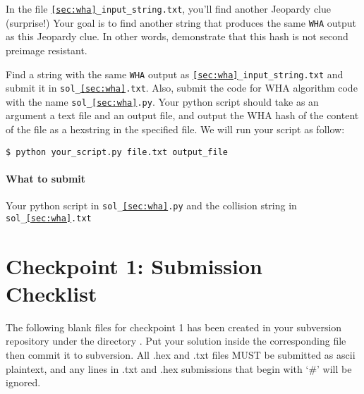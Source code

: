 \documentclass[letterpaper,12pt]{report}
\begin{document}
\smallskip
\noindent
In the file {\tt \ref{sec:wha}\_input\_string.txt}, you'll find another Jeopardy clue (surprise!) Your goal is to find another string that produces the same {\tt WHA} output as this Jeopardy clue. In other words, demonstrate that this hash is not second preimage resistant. 

\smallskip
\noindent
Find a string with the same {\tt WHA} output as {\tt \ref{sec:wha}\_input\_string.txt} and submit it in {\tt sol\_\ref{sec:wha}.txt}. Also, submit the code for WHA algorithm code with the name {\tt sol\_\ref{sec:wha}.py}.  Your python script should take as an argument a text file and an output file, and output the WHA hash of the content of the file as a hexstring in the specified file.  We will run your script as follow:
\begin{mdframed}
\begin{verbatim}
$ python your_script.py file.txt output_file
\end{verbatim}
\end{mdframed}

\paragraph{What to submit}

Your python script in {\tt sol\_\ref{sec:wha}.py} and the collision string in {\tt sol\_\ref{sec:wha}.txt}

\pagebreak
\section*{Checkpoint 1: Submission Checklist}
 
The following blank files for checkpoint 1 has been created in your subversion repository under the directory \mpnumber.  Put your solution inside the corresponding file then commit it to subversion. All .hex and .txt files MUST be submitted as ascii plaintext, and any lines in .txt and .hex submissions that begin with `\#' will be ignored.
\end{document}

